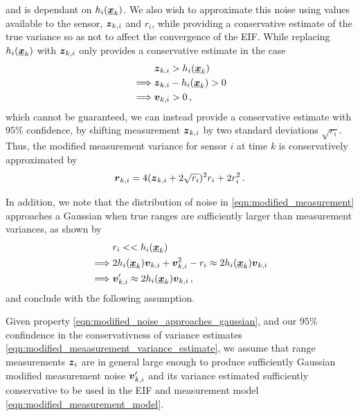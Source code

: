 \documentclass[twocolumn]{autart}
\begin{document}
and is dependant on $h_i({\boldsymbol{\underline{x}}}_k)$. We also wish to approximate this noise using values available to the sensor, ${\boldsymbol{z}}_{k,i}$ and $r_i$, while providing a conservative estimate of the true variance so as not to affect the convergence of the EIF. While replacing $h_i({\boldsymbol{\underline{x}}}_k)$ with ${\boldsymbol{z}}_{k,i}$ only provides a conservative estimate in the case
\begin{equation}
    \begin{split}
        &{\boldsymbol{z}}_{k,i} > h_i({\boldsymbol{\underline{x}}}_k) \\
        \implies &{\boldsymbol{z}}_{k,i} - h_i({\boldsymbol{\underline{x}}}_k) > 0 \\
        \implies &{\boldsymbol{v}}_{k,i} > 0\,,
    \end{split}
\end{equation}
which cannot be guaranteed, we can instead provide a conservative estimate with $95\%$ confidence, by shifting measurement ${\boldsymbol{z}}_{k,i}$ by two standard deviations $\sqrt{r_i}$. Thus, the modified measurement variance for sensor $i$ at time $k$ is conservatively approximated by
\begin{equation}
    {\boldsymbol{r}}_{k, i} = 4({\boldsymbol{z}}_{k,i} + 2\sqrt{r_i})^2r_i + 2r_i^2\,. \label{eqn:modified_meaasurement_variance_estimate}
\end{equation}

In addition, we note that the distribution of noise in \eqref{eqn:modified_measurement} approaches a Gaussian when true ranges are sufficiently larger than measurement variances, as shown by
\begin{equation}
    \begin{split}
        &r_i << h_i({\boldsymbol{\underline{x}}}_k) \\
        \implies &2h_i({\boldsymbol{\underline{x}}}_k){\boldsymbol{v}}_{k,i} + {\boldsymbol{v}}_{k,i}^2 - r_i \approx 2h_i({\boldsymbol{\underline{x}}}_k){\boldsymbol{v}}_{k,i} \\
        \implies &{\boldsymbol{v}}'_{k,i} \approx 2h_i({\boldsymbol{\underline{x}}}_k){\boldsymbol{v}}_{k,i}\,,
    \end{split} \label{eqn:modified_noise_approaches_gaussian}
\end{equation}
and conclude with the following assumption.
\begin{assum} \label{assum:measurement_size}
    Given property \eqref{eqn:modified_noise_approaches_gaussian}, and our $95\%$ confindence in the conservativness of variance estimates \eqref{eqn:modified_meaasurement_variance_estimate}, we assume that range measurements ${\boldsymbol{z}}_i$ are in general large enough to produce sufficiently Gaussian modified measurement noise ${\boldsymbol{v}}'_{k,i}$ and its variance estimated sufficiently conservative to be used in the EIF and measurement model \eqref{eqn:modified_measurement_model}.
\end{assum}
\end{document}
